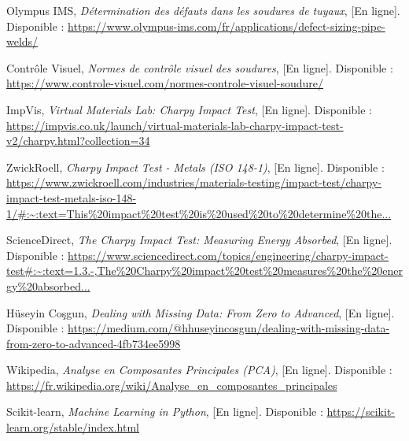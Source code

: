 \documentclass{article}
\begin{document}
\begin{thebibliography}{11}

Olympus IMS, 
\textit{Détermination des défauts dans les soudures de tuyaux}, 
[En ligne]. Disponible : 
\url{https://www.olympus-ims.com/fr/applications/defect-sizing-pipe-welds/}

Contrôle Visuel, 
\textit{Normes de contrôle visuel des soudures}, 
[En ligne]. Disponible : 
\url{https://www.controle-visuel.com/normes-controle-visuel-soudure/}

ImpVis,
\textit{Virtual Materials Lab: Charpy Impact Test}, 
[En ligne]. Disponible : 
\url{https://impvis.co.uk/launch/virtual-materials-lab-charpy-impact-test-v2/charpy.html?collection=34}

ZwickRoell, 
\textit{Charpy Impact Test - Metals (ISO 148-1)}, 
[En ligne]. Disponible : 
\url{https://www.zwickroell.com/industries/materials-testing/impact-test/charpy-impact-test-metals-iso-148-1/#:~:text=This%20impact%20test%20is%20used%20to%20determine%20the...}

ScienceDirect, 
\textit{The Charpy Impact Test: Measuring Energy Absorbed}, 
[En ligne]. Disponible : 
\url{https://www.sciencedirect.com/topics/engineering/charpy-impact-test#:~:text=1.3.-,The%20Charpy%20impact%20test%20measures%20the%20energy%20absorbed...}

Hüseyin Coşgun, 
\textit{Dealing with Missing Data: From Zero to Advanced}, 
[En ligne]. Disponible : 
\url{https://medium.com/@hhuseyincosgun/dealing-with-missing-data-from-zero-to-advanced-4fb734ee5998}

Wikipedia, 
\textit{Analyse en Composantes Principales (PCA)}, 
[En ligne]. Disponible : 
\url{https://fr.wikipedia.org/wiki/Analyse_en_composantes_principales}

Scikit-learn, 
\textit{Machine Learning in Python}, 
[En ligne]. Disponible : 
\url{https://scikit-learn.org/stable/index.html}


\end{thebibliography}
\end{document}
